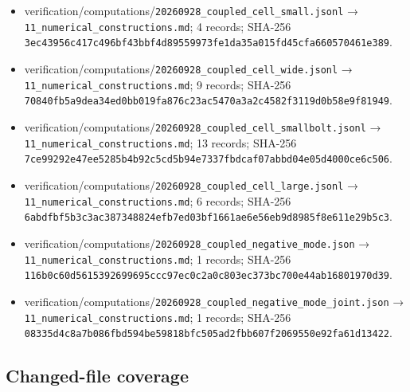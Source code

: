 \documentclass[
  10pt,
]{article}
\providecommand{\tightlist}{%
  \setlength{\itemsep}{0pt}\setlength{\parskip}{0pt}}
\begin{document}
\begin{itemize}
\tightlist
\item
  verification/computations/\nolinkurl{20260928_coupled_cell_small.jsonl} →
  \nolinkurl{11_numerical_constructions.md}; 4 records; SHA-256
  \nolinkurl{3ec43956c417c496bf43bbf4d89559973fe1da35a015fd45cfa660570461e389}.
\item
  verification/computations/\nolinkurl{20260928_coupled_cell_wide.jsonl} →
  \nolinkurl{11_numerical_constructions.md}; 9 records; SHA-256
  \nolinkurl{70840fb5a9dea34ed0bb019fa876c23ac5470a3a2c4582f3119d0b58e9f81949}.
\item
  verification/computations/\nolinkurl{20260928_coupled_cell_smallbolt.jsonl} →
  \nolinkurl{11_numerical_constructions.md}; 13 records; SHA-256
  \nolinkurl{7ce99292e47ee5285b4b92c5cd5b94e7337fbdcaf07abbd04e05d4000ce6c506}.
\item
  verification/computations/\nolinkurl{20260928_coupled_cell_large.jsonl} →
  \nolinkurl{11_numerical_constructions.md}; 6 records; SHA-256
  \nolinkurl{6abdfbf5b3c3ac387348824efb7ed03bf1661ae6e56eb9d8985f8e611e29b5c3}.
\item
  verification/computations/\nolinkurl{20260928_coupled_negative_mode.json} →
  \nolinkurl{11_numerical_constructions.md}; 1 records; SHA-256
  \nolinkurl{116b0c60d5615392699695ccc97ec0c2a0c803ec373bc700e44ab16801970d39}.
\item
  verification/computations/\nolinkurl{20260928_coupled_negative_mode_joint.json}
  → \nolinkurl{11_numerical_constructions.md}; 1 records; SHA-256
  \nolinkurl{08335d4c8a7b086fbd594be59818bfc505ad2fbb607f2069550e92fa61d13422}.
\end{itemize}

\hypertarget{changed-file-coverage}{%
\subsection{Changed-file coverage}\label{changed-file-coverage}}
\end{document}
